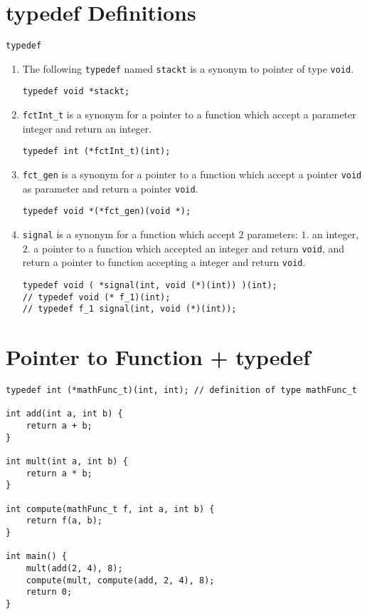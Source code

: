 \section{typedef Definitions}

\verb!typedef!

\begin{enumerate}
    \item The following \verb!typedef! named \verb!stackt! is a synonym to pointer of type \verb!void!.
    \begin{lstlisting}
typedef void *stackt;
    \end{lstlisting}

    \item \verb!fctInt_t! is a synonym for a pointer to a function which accept a parameter integer and return an integer.
    \begin{lstlisting}
typedef int (*fctInt_t)(int);
    \end{lstlisting}

    \item \verb!fct_gen! is a synonym for a pointer to a function which accept a pointer \verb!void! as parameter and return a pointer \verb!void!.
    \begin{lstlisting}
typedef void *(*fct_gen)(void *);
    \end{lstlisting}

    \item \verb!signal! is a synonym for a function which accept 2 parameters: $1.$ an integer, $2.$ a pointer to a function which accepted an integer and return \verb!void!, and return a pointer to function accepting a integer and return \verb!void!.
    \begin{lstlisting}
typedef void ( *signal(int, void (*)(int)) )(int);
// typedef void (* f_1)(int);
// typedef f_1 signal(int, void (*)(int));
    \end{lstlisting}
\end{enumerate}


%
%
\section{Pointer to Function + typedef}


\begin{lstlisting}
typedef int (*mathFunc_t)(int, int); // definition of type mathFunc_t

int add(int a, int b) {
    return a + b;
}

int mult(int a, int b) {
    return a * b;
}

int compute(mathFunc_t f, int a, int b) {
    return f(a, b);
}

int main() {
    mult(add(2, 4), 8);
    compute(mult, compute(add, 2, 4), 8);
    return 0;
}
\end{lstlisting}


